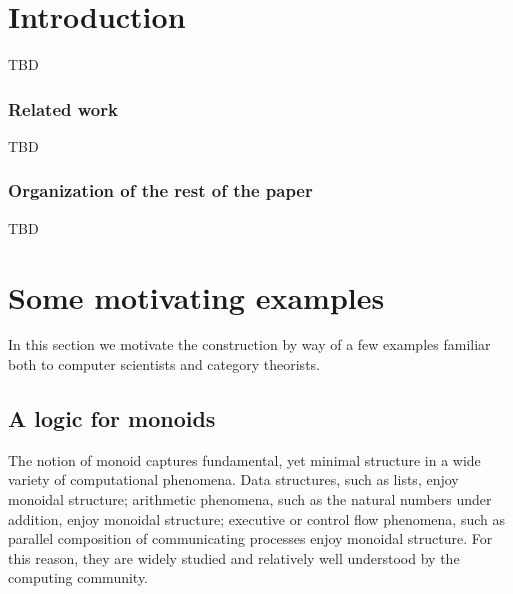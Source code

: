 \documentclass[]{acm_proc_article-sp}
\numberwithin{equation}{subsection}
\newcommand{\pic}{$\pi$-calculus}
\newcommand{\paperversion}{Draft Version 0.1 - Jan 7, 2015}
\newenvironment{toc}
{
\begin{list}{}{
   \setlength{\leftmargin}{0.4in}
   \setlength{\rightmargin}{0.6in}
   \setlength{\parskip}{0pt}
 } \item }
{\end{list}}
\begin{document}



\section{Introduction}

TBD

\subsubsection{Related work}


TBD

\subsubsection{Organization of the rest of the paper}

TBD


\section{Some motivating examples}

In this section we motivate the construction by way of a few examples
familiar both to computer scientists and category theorists.

\subsection{A logic for monoids}

The notion of monoid captures fundamental, yet minimal structure in a
wide variety of computational phenomena. Data structures, such as
lists, enjoy monoidal structure; arithmetic phenomena, such as the
natural numbers under addition, enjoy monoidal structure; executive or
control flow phenomena, such as parallel composition of communicating
processes enjoy monoidal structure. For this reason, they are widely
studied and relatively well understood by the computing community.
\end{document}
